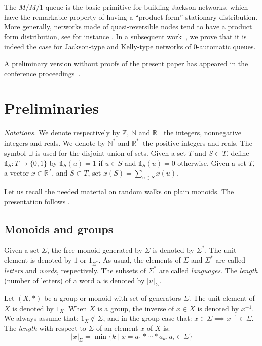 \documentclass[11pt,a4paper]{article}
\theoremstyle{remark}
\def\Blackboardfont{\mathbb}
\def\Z{{\Blackboardfont Z}}
\def\N{{\Blackboardfont N}}
\def\R{{\Blackboardfont R}}
\def\un{{\mathbb 1}}
\begin{document}
\medskip



The $M/M/1$ queue is the basic primitive for building Jackson
networks, which have the remarkable property of having a
``product-form'' stationary distribution. More generally, networks
made of quasi-reversible nodes tend to have a product form
distribution, see for instance \cite{serf99}. In a subsequent
work~\cite{DaMa06}, we prove that it is indeed the case for Jackson-type
and Kelly-type
networks of 0-automatic queues.

\medskip

A preliminary version without proofs of the present paper has appeared
in the conference proceedings~\cite{DaMa05}. 

\section{Preliminaries}\label{se-prel}

{\em Notations.} We denote respectively by $\Z$, $\N$ and $\R_+$ the
integers, nonnegative integers and reals. We 
denote by $\N^*$ and $\R_+^*$ the positive integers and reals.
The symbol $\sqcup$ is used for the disjoint union of sets.
Given a set $T$ and $S\subset T$, define  $\un_S: T
\rightarrow \{0,1\}$ by $\un_S(u)=1$ if $u\in S$ and $\un_S(u)=0$ otherwise.
Given a set $T$, a
vector $x\in \R^T$, and $S\subset T$, set
$x(S)=\sum_{u\in S} x(u)$.

\medskip

Let us recall the needed material on random walks on plain monoids. 
The presentation follows \cite{mair04,MaMa}.

\subsection{Monoids and groups}\label{sse-mg}

Given a set $\Sigma$, the free monoid generated by $\Sigma$ is
denoted by $\Sigma^{*}$. The unit element is denoted by $1$ or $1_{\Sigma^*}$. As
usual, the elements of $\Sigma$ and $\Sigma^{*}$ are called {\em
letters} and {\em words}, respectively. The subsets of
$\Sigma^{*}$ are called {\em languages}. The {\em length} (number
of letters) of a word $u$ is denoted by $|u|_{\Sigma}$.

Let $(X,\ast)$ be a group or monoid with set of generators
$\Sigma$. The unit element of $X$ is denoted  by $1_{X}$. When $X$
is a group, the inverse of $x\in X$ is denoted by $x^{-1}$. We
always assume that: $1_X \not\in \Sigma$, and in the group case
that: $x\in \Sigma \implies x^{-1} \in \Sigma$. The {\em length}
with respect to $\Sigma$ of an element $x$ of $X$ is:
\begin{equation}
|x|_{\Sigma} = \min \{ k \mid x = a_{1}\ast \cdots \ast a_{k},
a_{i} \in \Sigma \}
\end{equation}
\end{document}
